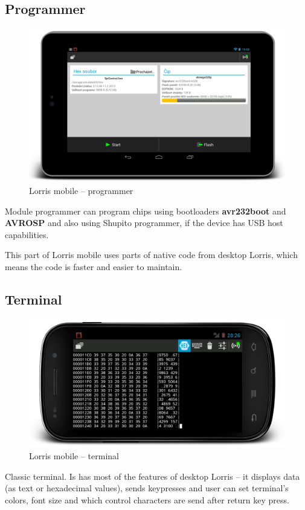 \documentclass[12pt, a4paper, oneside]{article}
\begin{document}
\subsection{Programmer}
\begin{figure}[H]
\begin{center}
\includegraphics[width=\textwidth]{img/mobile_programmer.png}
\caption{Lorris mobile -- programmer}
\end{center}
\end{figure}
Module programmer can program chips using bootloaders {\bf avr232boot} and {\bf AVROSP} and also using Shupito programmer, if the device has USB host capabilities.

This part of Lorris mobile uses parts of native code from desktop Lorris, which means the code is faster and easier to maintain.

\subsection{Terminal}
\begin{figure}[H]
\begin{center}
\includegraphics[width=\textwidth]{img/mobile_term.png}
\caption{Lorris mobile -- terminal}
\end{center}
\end{figure}
Classic terminal. Is has most of the features of desktop Lorris -- it displays data (as text or hexadecimal values), sends keypresses and user can set terminal's colors, font size and which control characters are send after return key press.
\end{document}
